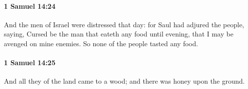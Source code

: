 		\paragraph{1 Samuel 14:24} %
			\label{1SAMUEL-14-24}

			And the men of Israel were distressed that day: for Saul had adjured the people, saying, Cursed be the man that eateth any food until evening, that I may be avenged on mine enemies. So none of the people tasted any food.


		\paragraph{1 Samuel 14:25} %
			\label{1SAMUEL-14-25}

			And all they of the land came to a wood; and there was honey upon the ground.


